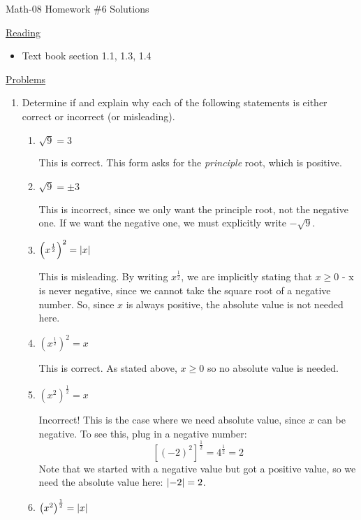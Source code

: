 \documentclass[letterpaper,12pt,fleqn]{article}
\begin{document}
\begin{center}
\Large Math-08 Homework \#6 Solutions
\end{center}

\vspace{0.5in}

\underline{Reading}

\begin{itemize}
\item Text book section 1.1, 1.3, 1.4
\end{itemize}

\underline{Problems}

\begin{enumerate}
\item Determine if and explain why each of the following statements is either
  correct or incorrect (or misleading).
\begin{enumerate}
\item $\sqrt{9}=3$

  This is correct. This form asks for the \emph{principle} root, which is
  positive.
  
\item $\sqrt{9}=\pm3$

  This is incorrect, since we only want the principle root, not the negative
  one. If we want the negative one, we must explicitly write $-\sqrt{9}$.
  
\item $\left(x^{\frac{1}{2}}\right)^2=\lvert x\rvert$

  This is misleading. By writing $x^{\frac{1}{2}}$, we are implicitly stating that
  $x\ge0$ - x is never negative, since we cannot take the square root of a
  negative number. So, since $x$ is always positive, the absolute value is not
  needed here.
  
\item $\left(x^{\frac{1}{2}}\right)^2=x$

  This is correct. As stated above, $x\ge0$ so no absolute value is needed.
  
\item $\left(x^2\right)^{\frac{1}{2}}=x$

  Incorrect! This is the case where we need absolute value, since $x$ can be
  negative. To see this, plug in a negative number:
  \[[(-2)^2]^{\frac{1}{2}}=4^{\frac{1}{2}}=2\]
  Note that we started with a negative value but got a positive value, so we
  need the absolute value here: $\lvert-2\rvert=2$.
  
\item $\left(x^2\right)^{\frac{1}{2}}=\lvert x\rvert$


\end{enumerate}
\end{enumerate}
\end{document}
